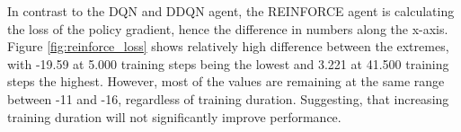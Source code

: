 In contrast to the DQN and DDQN agent, the REINFORCE agent is calculating the loss of the policy gradient, hence the difference in numbers along the x-axis. Figure \ref{fig:reinforce_loss} shows relatively high difference between the extremes, with -19.59 at 5.000 training steps being the lowest and 3.221 at 41.500 training steps the highest. However, most of the values are remaining at the same range between -11 and -16, regardless of training duration. Suggesting, that increasing training duration will not significantly improve performance.



\begin{figure}[H]
	\centering
	\qquad
	\qquad

\end{figure}
